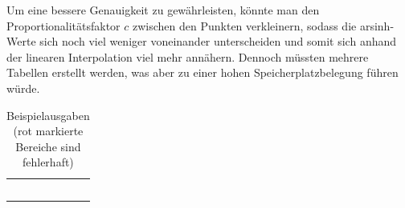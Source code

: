 \documentclass[course=erap]{aspdoc}
\begin{document}
Um eine bessere Genauigkeit zu gewährleisten, könnte man den Proportionalitätsfaktor $c$ zwischen den Punkten verkleinern, sodass die arsinh-Werte sich noch viel weniger voneinander unterscheiden und somit sich anhand der linearen Interpolation viel mehr annähern. Dennoch müssten mehrere Tabellen erstellt werden, was aber zu einer hohen Speicherplatzbelegung führen würde.


\begin{table}[]
    \centering 
    \begin{tabular}{lllll}
        \toprule
        \fontsize{7}{8}\selectfont{x} & \fontsize{7}{8}\selectfont{V0} & \fontsize{7}{8}\selectfont{V1} & \fontsize{7}{8}\selectfont{V2} & \fontsize{7}{8}\selectfont{Erwartet} \\
        \midrule
        \fontsize{7}{8}\selectfont{0.5} & 
        \fontsize{7}{8}\selectfont{0.4812118250596034\textcolor{red}{71}} & \fontsize{7}{8}\selectfont{0.481\textcolor{red}{148178453539133}} & \fontsize{7}{8}\selectfont{0.4812118250596034\textcolor{red}{71}} & 
        \fontsize{7}{8}\selectfont{0.481211825059603447} \\
        \fontsize{7}{8}\selectfont{1.0} & 
        \fontsize{7}{8}\selectfont{0.88137358701954\textcolor{red}{2493}} & \fontsize{7}{8}\selectfont{0.881\textcolor{red}{122391422050288}} & \fontsize{7}{8}\selectfont{0.881373587019543\textcolor{red}{270}} & 
        \fontsize{7}{8}\selectfont{0.881373587019543025} \\
        \fontsize{7}{8}\selectfont{9.37545} & 
        \fontsize{7}{8}\selectfont{2.9340738648188\textcolor{red}{47799}} & \fontsize{7}{8}\selectfont{2.93\textcolor{red}{3432601961815767}} & \fontsize{7}{8}\selectfont{2.9340738648188526\textcolor{red}{84}} & 
        \fontsize{7}{8}\selectfont{2.934073864818852671} \\
        \fontsize{7}{8}\selectfont{4324356.456} & 
        \fontsize{7}{8}\selectfont{15.9729210715362\textcolor{red}{00444}} & \fontsize{7}{8}\selectfont{15.972\textcolor{red}{582216140555289}} & \fontsize{7}{8}\selectfont{15.97292107153622\textcolor{red}{8865}} & 
        \fontsize{7}{8}\selectfont{15.972921071536229602} \\
        \fontsize{7}{8}\selectfont{98888888888.5} & 
        \fontsize{7}{8}\selectfont{26.01040990289239\textcolor{red}{1187}} & \fontsize{7}{8}\selectfont{26.0\textcolor{red}{09677936276474952}} & \fontsize{7}{8}\selectfont{26.01040990289239\textcolor{red}{1187}} & 
        \fontsize{7}{8}\selectfont{26.010409902892390020} \\
        \bottomrule
    \end{tabular}
    \caption{Beispielausgaben (rot markierte Bereiche sind fehlerhaft)}
\end{table}
\end{document}
